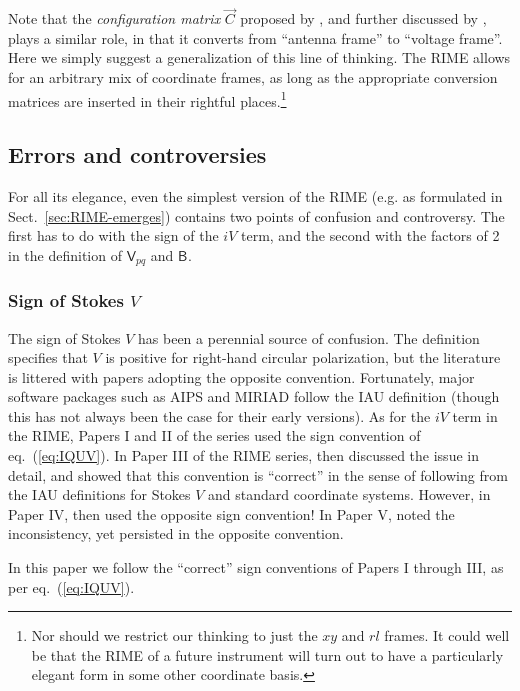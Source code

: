 \documentclass[]{aa}
\newcommand{\jones}[2]{\vec {#1}_{#2}}
\newcommand{\coh}[2]{\mathsf{{#1}}_{{#2}}}
\begin{document}
Note that the {\em configuration matrix} $\jones{C}{}$ proposed by \citet{ME1}, and further discussed by \citet{JEN:note185}, plays a similar role, in that it converts from ``antenna frame'' to ``voltage frame''. Here we simply suggest a generalization of this line of thinking. The RIME allows for an arbitrary mix of coordinate frames, as long as the appropriate conversion matrices are inserted in their rightful places.\footnote{Nor should we restrict our thinking to just the $xy$ and $rl$ frames. It could well be that the RIME of a future instrument will turn out to have a particularly elegant form in some other coordinate basis.}

\subsection{Errors and controversies\label{sec:controversies}}

For all its elegance, even the simplest version of the RIME (e.g. as formulated in Sect.~\ref{sec:RIME-emerges}) contains two points of confusion and controversy. The first has to do with the sign of the $iV$ term, and the second with the factors of 2 in the definition of $\coh{V}{pq}$ and $\coh{B}{}$.

\subsubsection{Sign of Stokes $V$}

The sign of Stokes $V$ has been a perennial source of confusion. The \citet{IAU74} definition specifies that $V$ is positive for right-hand circular polarization, but the literature is littered with papers adopting the opposite convention. Fortunately, major software packages such as AIPS and MIRIAD follow the IAU definition (though this 
has not always been the case for their early versions). As for the $iV$ term in the RIME, Papers I and II of the series \citep{ME1,ME2} used the sign convention of eq.~(\ref{eq:IQUV}). In Paper III of the RIME series, \citet{ME3} then discussed the issue in detail, and showed that this convention is ``correct'' in the sense of following from the IAU definitions for Stokes $V$ and standard coordinate systems. However, in Paper IV, \citet{ME4} then used the opposite sign convention! In Paper V, \citet{ME5} noted the inconsistency, yet persisted in the opposite convention. 

In this paper we follow the ``correct'' sign conventions of Papers I through III, as per eq.~(\ref{eq:IQUV}).
\end{document}
